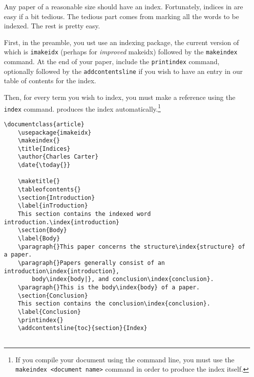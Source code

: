     Any paper of a reasonable size should have an index. Fortunately, indices in \Lx{} are easy if a bit tedious. The tedious part comes from marking all the words to be indexed. The rest is pretty easy.

    First, in the preamble, you ust use an indexing package, the current version of which is \texttt{imakeidx} (perhaps for \textit{improved} makeidx) followed by the \texttt{makeindex} command. At the end of your paper, include the \texttt{printindex} command, optionally followed by the \texttt{addcontentsline} if you wish to have an entry in our table of contents for the index. 

    Then, for every term you wish to index, you must make a reference using the \texttt{index} command. \Lx produces the index automatically.\footnote{If you compile your document using the command line, you must use the \texttt{makeindex <document name>} command in order to produce the index itself.}

        \begin{verbatim}
\documentclass{article}
    \usepackage{imakeidx}
    \makeindex{}
    \title{Indices}
    \author{Charles Carter}
    \date{\today{}}
 
    \maketitle{}
    \tableofcontents{}
    \section{Introduction}
    \label{inTroduction}
    This section contains the indexed word introduction.\index{introduction}
    \section{Body}
    \label{Body}
    \paragraph{}This paper concerns the structure\index{structure} of a paper.
    \paragraph{}Papers generally consist of an introduction\index{introduction}, 
        body\index{body|}, and conclusion\index{conclusion}.
    \paragraph{}This is the body\index{body} of a paper.
    \section{Conclusion}
    This section contains the conclusion\index{conclusion}.
    \label{Conclusion}
    \printindex{}
    \addcontentsline{toc}{section}{Index}
    
        \end{verbatim}

